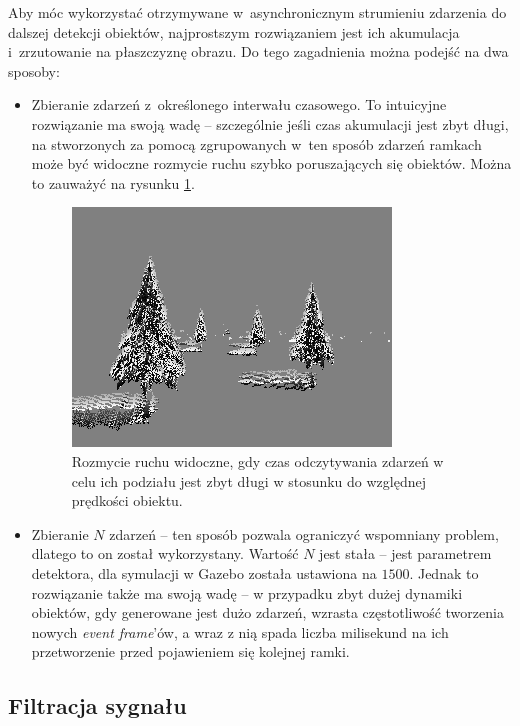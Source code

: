 Aby móc wykorzystać otrzymywane w~asynchronicznym strumieniu zdarzenia do dalszej detekcji obiektów, najprostszym rozwiązaniem jest ich akumulacja i~zrzutowanie na płaszczyznę obrazu. Do tego zagadnienia można podejść na dwa sposoby:
\begin{itemize}
    \item Zbieranie zdarzeń z~określonego interwału czasowego. To intuicyjne rozwiązanie ma swoją wadę -- szczególnie jeśli czas akumulacji jest zbyt długi, na stworzonych za pomocą zgrupowanych w~ten sposób zdarzeń ramkach może być widoczne rozmycie ruchu szybko poruszających się obiektów. Można to zauważyć na rysunku \ref{fig:motion_blur}.
    
    \begin{figure}[H]
        \centering
        \includegraphics[width=0.4\linewidth]{images/motion_blur.png}
        \caption{Rozmycie ruchu widoczne, gdy czas odczytywania zdarzeń w celu ich podziału jest zbyt długi w stosunku do względnej prędkości obiektu.}
        \label{fig:motion_blur}
    \end{figure}
    
    \item Zbieranie $N$ zdarzeń -- ten sposób pozwala ograniczyć wspomniany problem, dlatego to on został wykorzystany. Wartość $N$ jest stała -- jest parametrem detektora, dla symulacji w Gazebo została ustawiona na $1500$. Jednak to rozwiązanie także ma swoją wadę -- w przypadku zbyt dużej dynamiki obiektów, gdy generowane jest dużo zdarzeń, wzrasta częstotliwość tworzenia nowych \textit{event frame}'ów, a wraz z nią spada liczba milisekund na ich przetworzenie przed pojawieniem się kolejnej ramki.
\end{itemize}


\subsection{Filtracja sygnału}

